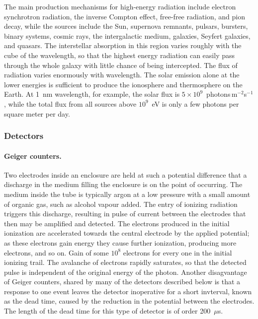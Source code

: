 The main production mechanisms for high-energy radiation include electron
synchrotron radiation, the inverse Compton effect, free-free radiation, 
and pion decay, while the sources include the Sun, supernova remnants, pulsars,
bursters, binary systems, cosmic rays, the intergalactic medium, galaxies,
Seyfert galaxies, and quasars. The interstellar absorption in this region
varies roughly with the cube of the wavelength, so that the highest 
energy radiation can easily pass through the whole galaxy with little 
chance of being intercepted. The flux of radiation varies enormously
with wavelength. The solar emission alone at the lower energies is 
sufficient to produce the ionosphere and thermosphere on the Earth. At 
1~nm wavelength, for example, the solar flux is 
$5\times 10^9$~photons$\,$m$^{-2}$s$^{-1}$, while the total flux from all sources
above $10^9$~eV is only a few photons per square meter per day.

\subsubsection{Detectors}

\paragraph{Geiger counters.} Two electrodes inside an enclosure are held at such a 
potential difference that a discharge in the medium filling the enclosure
is on the point of occurring. The medium inside the tube is typically argon at a 
low pressure with a small amount of organic gas, such as alcohol vapour added.
The entry of ionizing radiation triggers this discharge,
resulting in pulse of current between the electrodes that then may be amplified and
detected. The electrons produced in the initial ionization are accelerated towards
the central electrode by the applied potential; as these electrons gain energy they
cause further ionization, producing more electrons, and so on. Gain of some $10^8$ electrons for every one in the initial ionizing trail. The avalanche of electrons rapidly 
saturates, so that the detected pulse is independent of the original energy of the
photon. Another disagvantage of Geiger counters, shared by many of the
detectors described below is that a response to one event leaves the
detector inoperative for a short invterval, known as the dead
time, caused by the reduction in the potential between the
electrodes. The length of the dead time for this type of detector is of
order 200~$\mu$s.

